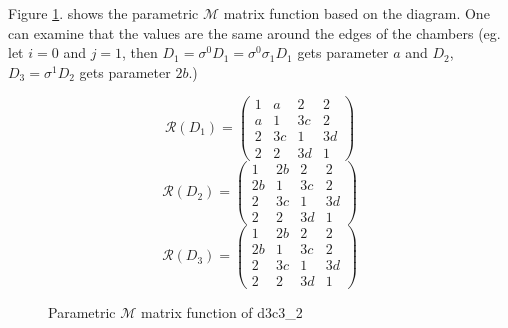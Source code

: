 \documentclass[12pt,a4paper]{article}
\theoremstyle{plain}%
\theoremstyle{definition}
\theoremstyle{remark}
\begin{document}
Figure \ref{fig:d3c3_2_pm}. shows the parametric $\mathcal{M}$ matrix function
based on the diagram. One can examine that the values are the same around the
edges of the chambers (eg. let $i=0$ and $j=1$, then
$D_1=\sigma^0D_1=\sigma^0\sigma_1D_1$ gets parameter $a$ and $D_2$,
$D_3=\sigma^1D_2$ gets parameter $2b$.)

\begin{figure}
  \caption{\label{fig:d3c3_2_pm} Parametric $\mathcal{M}$ matrix function of d3c3\_2}
  \begin{equation*}
    \mathcal{R}(D_1)=
    \left(
    \begin{array}{cccc}
      1 & a & 2 & 2\\
      a & 1 & 3c & 2\\
      2 & 3c & 1 & 3d\\
      2 & 2 & 3d & 1
    \end{array}
    \right)
  \end{equation*}
  \begin{equation*}
    \mathcal{R}(D_2)=
    \left(
    \begin{array}{cccc}
      1 & 2b & 2 & 2\\
      2b & 1 & 3c & 2\\
      2 & 3c & 1 & 3d\\
      2 & 2 & 3d & 1
    \end{array}
    \right)
  \end{equation*}
  \begin{equation*}
    \mathcal{R}(D_3)=
    \left(
    \begin{array}{cccc}
      1 & 2b & 2 & 2\\
      2b & 1 & 3c & 2\\
      2 & 3c & 1 & 3d\\
      2 & 2 & 3d & 1
    \end{array}
    \right)
  \end{equation*}
\end{figure}
\end{document}
